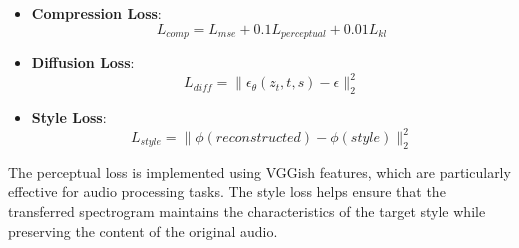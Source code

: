 \begin{itemize}
    \item \textbf{Compression Loss}:
    \begin{equation}
        L_{comp} = L_{mse} + 0.1L_{perceptual} + 0.01L_{kl}
    \end{equation}
    
    \item \textbf{Diffusion Loss}:
    \begin{equation}
        L_{diff} = \| \epsilon_\theta(z_t, t, s) - \epsilon \|_2^2
    \end{equation}
    
    \item \textbf{Style Loss}:
    \begin{equation}
        L_{style} = \| \phi(reconstructed) - \phi(style) \|_2^2
    \end{equation}
\end{itemize}

The perceptual loss is implemented using VGGish features, which are particularly effective for audio processing tasks. The style loss helps ensure that the transferred spectrogram maintains the characteristics of the target style while preserving the content of the original audio. 